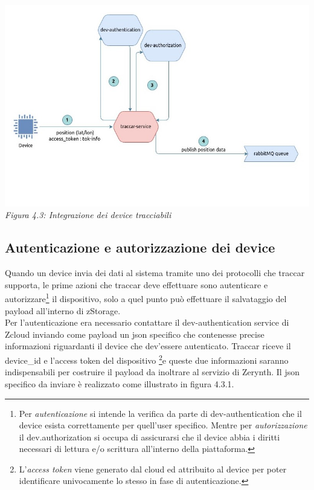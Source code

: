 \documentclass[a4paper,titlepage,12pt]{book}
\begin{document}
\begin{center}
\centering
\includegraphics[scale=0.6]{images/dev-aut-traccar.jpg}\\ 
\textit{Figura 4.3: Integrazione dei device tracciabili}
\end{center}

\subsection{\sffamily
Autenticazione e autorizzazione dei device}
Quando un device invia dei dati al sistema tramite uno dei protocolli che traccar supporta, le prime azioni che traccar deve effettuare sono autenticare e autorizzare\footnote{\sffamily
Per \textit{autenticazione} si intende la verifica da parte di dev-authentication che il device esista correttamente per quell'user specifico. Mentre per \textit{autorizzazione} il dev.authorization si occupa di assicurarsi che il device abbia i diritti necessari di lettura e/o scrittura all'interno della piattaforma.} il dispositivo, solo a quel punto può effettuare il salvataggio del payload all'interno di zStorage.\\
Per l'autenticazione era necessario contattare il dev-authentication service di Zcloud inviando come payload un json specifico che contenesse precise informazioni riguardanti il device che dev'essere autenticato. Traccar riceve il device\_id e l'access token del dispositivo \footnote{\sffamily
L'\textit{access token} viene generato dal cloud ed attribuito al device per poter identificare univocamente lo stesso in fase di autenticazione.}e queste due informazioni saranno indispensabili per costruire il payload da inoltrare al servizio di Zerynth. Il json specifico da inviare è realizzato come illustrato in figura 4.3.1.
\end{document}
